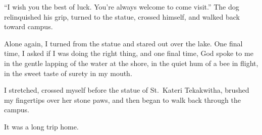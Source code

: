 ``I wish you the best of luck. You're always welcome to come visit.'' The dog relinquished his grip, turned to the statue, crossed himself, and walked back toward campus.

Alone again, I turned from the statue and stared out over the lake. One final time, I asked if I was doing the right thing, and one final time, God spoke to me in the gentle lapping of the water at the shore, in the quiet hum of a bee in flight, in the sweet taste of surety in my mouth.

I stretched, crossed myself before the statue of St.~Kateri Tekakwitha, brushed my fingertips over her stone paws, and then began to walk back through the campus.

It was a long trip home.

\section{}
